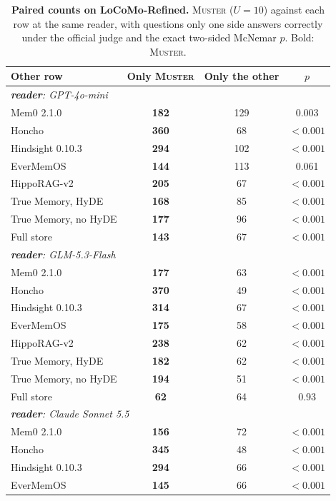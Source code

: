 \documentclass{article}
\newcommand{\tabfont}{\fontsize{7.5}{8.5}\selectfont\renewcommand{\arraystretch}{1.0}}
\newcommand{\sys}{\textsc{Muster}}
\begin{document}
\begin{table}[!t]
\centering\tabfont
\caption{\textbf{Paired counts on LoCoMo-Refined.} \sys{} ($U{=}10$) against each row at the same reader, with questions only one side answers correctly under the official judge \cite{locomorefined} and the exact two-sided McNemar $p$. Bold: \sys{}.}
\label{tab:refinedpair}
\setlength{\aboverulesep}{0pt}\setlength{\belowrulesep}{0pt}\setlength{\extrarowheight}{0.8pt}
\begin{tabular}{l>{\columncolor{oursbg}}ccc}
\toprule
Other row & \textbf{Only \sys{}} & Only the other & $p$ \\
\midrule
\multicolumn{4}{l}{\emph{\textbf{reader}: GPT-4o-mini}}\\
Mem0 2.1.0 & \textbf{182} & 129 & 0.003 \\
Honcho & \textbf{360} & 68 & $<0.001$ \\
Hindsight 0.10.3 & \textbf{294} & 102 & $<0.001$ \\
EverMemOS & \textbf{144} & 113 & 0.061 \\
HippoRAG-v2 & \textbf{205} & 67 & $<0.001$ \\
True Memory, HyDE & \textbf{168} & 85 & $<0.001$ \\
True Memory, no HyDE & \textbf{177} & 96 & $<0.001$ \\
Full store & \textbf{143} & 67 & $<0.001$ \\
\multicolumn{4}{l}{\emph{\textbf{reader}: GLM-5.3-Flash}}\\
Mem0 2.1.0 & \textbf{177} & 63 & $<0.001$ \\
Honcho & \textbf{370} & 49 & $<0.001$ \\
Hindsight 0.10.3 & \textbf{314} & 67 & $<0.001$ \\
EverMemOS & \textbf{175} & 58 & $<0.001$ \\
HippoRAG-v2 & \textbf{238} & 62 & $<0.001$ \\
True Memory, HyDE & \textbf{182} & 62 & $<0.001$ \\
True Memory, no HyDE & \textbf{194} & 51 & $<0.001$ \\
Full store & \textbf{62} & 64 & 0.93 \\
\multicolumn{4}{l}{\emph{\textbf{reader}: Claude Sonnet 5.5}}\\
Mem0 2.1.0 & \textbf{156} & 72 & $<0.001$ \\
Honcho & \textbf{345} & 48 & $<0.001$ \\
Hindsight 0.10.3 & \textbf{294} & 66 & $<0.001$ \\
EverMemOS & \textbf{145} & 66 & $<0.001$ \\

\end{tabular}
\end{table}
\end{document}
